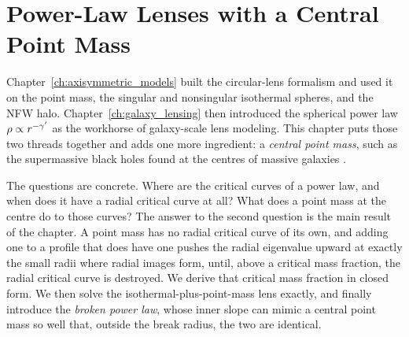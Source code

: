 
\chapter{Power-Law Lenses with a Central Point Mass}
\label{ch:power_law_point_mass}

\noindent
Chapter~\ref{ch:axisymmetric_models} built the circular-lens formalism
and used it on the point mass, the singular and nonsingular isothermal
spheres, and the NFW halo.  Chapter~\ref{ch:galaxy_lensing} then
introduced the spherical power law $\rho\propto r^{-\gamma'}$ as the
workhorse of galaxy-scale lens modeling.  This chapter puts those two
threads together and adds one more ingredient: a \emph{central point
mass}, such as the supermassive black holes found at the centres of
massive galaxies \citep{kormendy_ho_2013}.

The questions are concrete.  Where are the critical curves of a power
law, and when does it have a radial critical curve at all?  What
does a point mass at the centre do to those curves?  The answer to the
second question is the main result of the chapter.  A point mass has no
radial critical curve of its own, and adding one to a profile that
does have one pushes the radial eigenvalue upward at exactly
the small radii where radial images form, until, above a critical mass
fraction, the radial critical curve is destroyed.  We derive that
critical mass fraction in closed form.  We then solve the
isothermal-plus-point-mass lens exactly, and finally introduce the
\emph{broken power law}, whose inner slope can mimic a central point
mass so well that, outside the break radius, the two are
identical.

